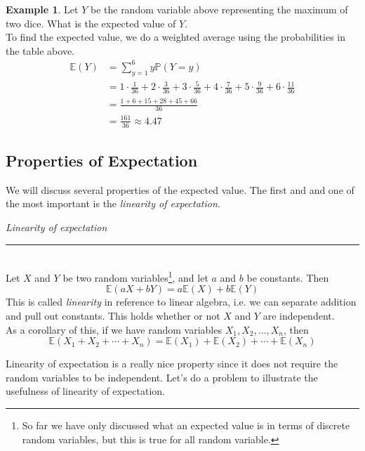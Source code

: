 \documentclass[12pt]{article}
\theoremstyle{definition}
\newtheorem*{example}{Example}
\theoremstyle{remark}
\def\P{{\mathbb P}}
\def\E{{\mathbb E}}
\begin{document}
\begin{example}Let $Y$ be the random variable above representing the maximum of two dice. What is the expected value of $Y$.\\

To find the expected value, we do a weighted average using the probabilities in the table above.
\begin{align*}
\E(Y) &= \sum_{y = 1}^6 y \P(Y = y) \\
&= 1 \cdot \frac{1}{36} + 2 \cdot \frac{3}{36} + 3 \cdot \frac{5}{36} + 4 \cdot \frac{7}{36} + 5 \cdot \frac{9}{36} + 6 \cdot \frac{11}{36} \\
&= \frac{1 + 6 + 15 + 28 + 45 + 66}{36} \\
&= \frac{161}{36} \approx 4.47
\end{align*}
\end{example}

\subsection{Properties of Expectation}
We will discuss several properties of the expected value. The first and and one of the most important is the \emph{linearity of expectation}.

\begin{framed}
  \emph{Linearity of expectation}\\
  \rule{\dimexpr{}\fboxrule}{.1pt} \\
Let $X$ and $Y$ be two random variables\footnote{So far we have only discussed what an expected value is in terms of discrete random variables, but this is true for all random variable.}, and let $a$ and $b$ be constants. Then
\[
\E(aX + bY) = a\E(X) + b\E(Y)
\]
This is called \emph{linearity} in reference to linear algebra, i.e. we can separate addition and pull out constants. This holds whether or not $X$ and $Y$ are independent. \\

As a corollary of this, if we have random variables $X_1, X_2, \dots, X_n$, then
\[
\E(X_1 + X_2 + \cdots + X_n) = \E(X_1) + \E(X_2) + \cdots + \E(X_n)
\]
\end{framed}

Linearity of expectation is a really nice property since it does not require the random variables to be independent. Let's do a problem to illustrate the usefulness of linearity of expectation.
\end{document}
